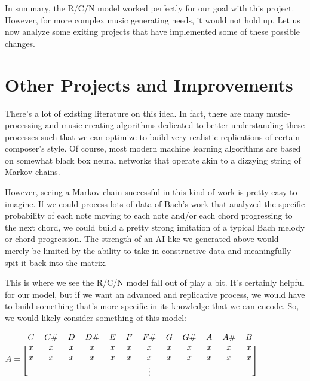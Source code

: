 \documentclass{article}
\begin{document}
In summary, the R/C/N model worked perfectly for our goal with this project. However, for more complex music generating needs, it would not hold up. Let us now analyze some exiting projects that have implemented some of these possible changes.

\pagebreak

\section{Other Projects and Improvements}

There's a lot of existing literature on this idea. In fact, there are many music-processing and music-creating algorithms dedicated to better understanding these processes such that we can optimize to build very realistic replications of certain composer's style. Of course, most modern machine learning algorithms are based on somewhat black box neural networks that operate akin to a dizzying string of Markov chains.

However, seeing a Markov chain successful in this kind of work is pretty easy to imagine. If we could process lots of data of Bach's work that analyzed the specific probability of each note moving to each note and/or each chord progressing to the next chord, we could build a pretty strong imitation of a typical Bach melody or chord progression. The strength of an AI like we generated above would merely be limited by the ability to take in constructive data and meaningfully spit it back into the matrix. 

This is where we see the R/C/N model fall out of play a bit. It's certainly helpful for our model, but if we want an advanced and replicative process, we would have to build something that's more specific in its knowledge that we can encode. So, we would likely consider something of this model:

\begin{center}
    $A=
    \begin{blockarray}{cccccccccccc}
    C & C\# & D & D\# & E & F & F\# & G & G\# & A & A\# & B \\
        \begin{block}{[cccccccccccc]} 
            x&x&x&x&x&x&x&x&x&x&x&x\\
            x&x&x&x&x&x&x&x&x&x&x&x\\
            &&&&&&\vdots \\ 
        \end{block}
    \end{blockarray}$
\end{center}
\end{document}
